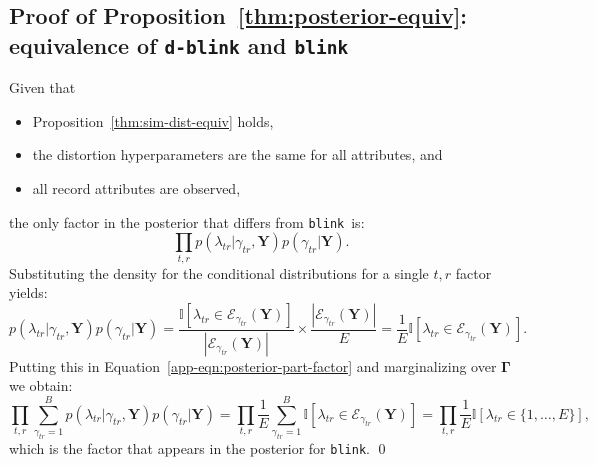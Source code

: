 \documentclass[12pt,letterpaper]{article}
\renewcommand\vec{\bm}
\newcommand{\partset}{\mathcal{E}} %
\newcommand{\1}[1]{\mathbb{I}\!\left[#1\right]} %
\newcommand{\dblink}{\texttt{\upshape \lowercase{d-blink}}} %
\newcommand{\blink}{\texttt{\upshape \lowercase{blink}}} %
\begin{document}
\subsection{Proof of Proposition~\ref{thm:posterior-equiv}: equivalence of 
\texorpdfstring{\dblink}{d-blink} and \texorpdfstring{\blink}{blink}}
\label{app-sec:proof-posterior-equiv}
Given that 
\begin{itemize}
  \item Proposition~\ref{thm:sim-dist-equiv} holds, 
  \item the distortion hyperparameters are the same for all attributes, and 
  \item all record attributes are observed,
\end{itemize}
the only factor in the posterior that differs from \blink\ is:
\begin{equation}
\prod_{t,r} p(\lambda_{tr}| \gamma_{tr}, \vec{Y}) 
  p(\gamma_{tr}|\vec{Y}).
\label{app-eqn:posterior-part-factor}
\end{equation}
Substituting the density for the conditional distributions 
for a single $t,r$ factor yields:
\begin{equation*}
p(\lambda_{tr}|\gamma_{tr},\vec{Y}) p(\gamma_{tr}|\vec{Y})
= \frac{\1{\lambda_{tr} \in \partset_{\gamma_{tr}}(\vec{Y})}}
{|\partset_{\gamma_{tr}}(\vec{Y})|} 
\times \frac{|\partset_{\gamma_{tr}}(\vec{Y})|}{E} = \frac{1}{E} \1{\lambda_{tr} \in \partset_{\gamma_{tr}}(\vec{Y})}.
\end{equation*}
Putting this in Equation~\ref{app-eqn:posterior-part-factor} and 
marginalizing over $\vec{\Gamma}$ we obtain:
\begin{equation*}
\prod_{t,r} \sum_{\gamma_{tr} = 1}^{B} p(\lambda_{tr}|\gamma_{tr},\vec{Y}) p(\gamma_{tr}|\vec{Y}) 
= \prod_{t,r} \frac{1}{E} \sum_{\gamma_{tr} = 1}^{B} \1{\lambda_{tr} \in \partset_{\gamma_{tr}}(\vec{Y})} 
= \prod_{t,r} \frac{1}{E} \1{\lambda_{tr} \in \{1,\ldots,E\}},
\end{equation*}
which is the factor that appears in the posterior for \blink. \qed
\end{document}
